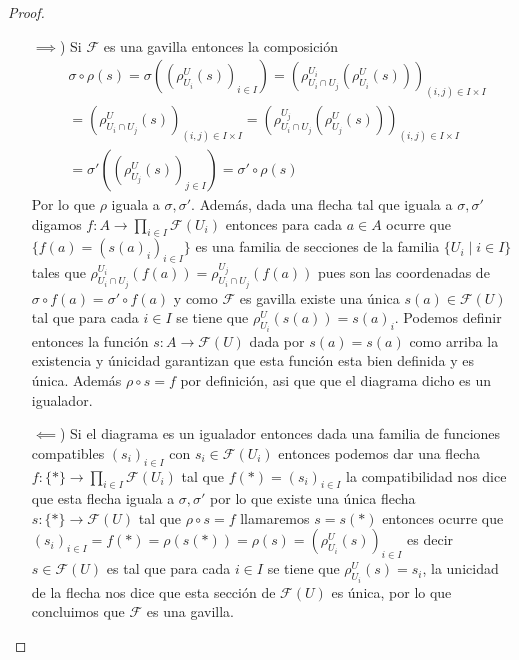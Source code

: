 \documentclass[14pt]{extarticle}
\begin{document}
\begin{proof}
    \begin{enumerate}
        \item[$\implies$)] Si $\mathcal{F}$ es una 
        gavilla entonces la composición
        \begin{align*}
            &\sigma \circ\rho(s)
            =\sigma\left(\left(\rho_{U_i}^{U}(s)\right)_{i\in I}\right)
            =\left(\rho_{U_i\cap U_j}^{U_i}(\rho_{U_i}^{U}(s))\right)_{(i,j)\in I\times I}\\
            &=\left(\rho_{U_i\cap U_j}^{U}(s)\right)_{(i,j)\in I\times I}
            =\left(\rho_{U_i\cap U_j}^{U_j}(\rho_{U_j}^{U}(s))\right)_{(i,j)\in I\times I}\\
            &=\sigma'\left(\left(\rho_{U_j}^{U}(s)\right)_{j\in I}\right)
            =\sigma'\circ\rho(s)
        \end{align*}
        Por lo que $\rho$ iguala a $\sigma, \sigma'$. 
        Además, dada una flecha tal que iguala a $\sigma,\sigma'$
        digamos $f:A\rightarrow \prod_{i\in I}\mathcal{F}(U_i)$
        entonces para cada $a\in A$ ocurre que $\{f(a)=(s(a)_i)_{i\in I}\}$ 
        es una familia de secciones de 
        la familia $\{U_i\mid i\in I\}$ tales que 
        $\rho_{U_i\cap U_j}^{U_i}(f(a))=\rho_{U_i\cap U_j}^{U_j}(f(a))$
        pues son las coordenadas de $\sigma\circ f(a)=\sigma'\circ f(a)$
        y como $\mathcal{F}$ es gavilla existe una única 
        $s(a)\in \mathcal{F}(U)$ tal que para cada $i\in I$
        se tiene que $\rho_{U_i}^{U}(s(a))=s(a)_i$.
        Podemos definir entonces la función $s:A\rightarrow \mathcal{F}(U)$
        dada por $s(a)=s(a)$ como arriba la existencia y únicidad garantizan
        que esta función esta bien definida y es única. Además $\rho\circ s= f$
        por definición, asi que que el diagrama dicho es un igualador.
        \item[$\impliedby$)] Si el diagrama es un igualador entonces
        dada una familia de funciones compatibles $(s_i)_{i\in I}$
        con $s_i\in \mathcal{F}(U_i)$ entonces podemos dar una flecha 
        $f:\{*\}\rightarrow \prod_{i\in I}\mathcal{F}(U_i)$ tal que $f(*)=(s_i)_{i\in I}$
        la compatibilidad nos dice que esta flecha iguala a $\sigma, \sigma'$
        por lo que existe una única flecha $s:\{*\}\rightarrow \mathcal{F}(U)$
        tal que $\rho\circ s= f$ llamaremos $s=s(*)$ entonces ocurre que
        $(s_i)_{i\in I}=f(*)=\rho(s(*))=\rho(s)=(\rho_{U_i}^{U}(s))_{i\in I}$
        es decir $s\in\mathcal{F}(U)$ es tal que 
        para cada $i\in I$ se tiene que 
        $\rho_{U_i}^{U}(s)=s_i$, la unicidad de la flecha 
        nos dice que esta sección de $\mathcal{F}(U)$ es única, por lo que
        concluimos que $\mathcal{F}$ es una gavilla.
    \end{enumerate}
\end{proof}
\end{document}
